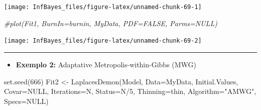 \documentclass[
]{book}
\newenvironment{Shaded}{\begin{snugshade}}{\end{snugshade}}
\newcommand{\AttributeTok}[1]{\textcolor[rgb]{0.77,0.63,0.00}{#1}}
\newcommand{\CommentTok}[1]{\textcolor[rgb]{0.56,0.35,0.01}{\textit{#1}}}
\newcommand{\ConstantTok}[1]{\textcolor[rgb]{0.00,0.00,0.00}{#1}}
\newcommand{\DecValTok}[1]{\textcolor[rgb]{0.00,0.00,0.81}{#1}}
\newcommand{\FunctionTok}[1]{\textcolor[rgb]{0.00,0.00,0.00}{#1}}
\newcommand{\NormalTok}[1]{#1}
\newcommand{\OtherTok}[1]{\textcolor[rgb]{0.56,0.35,0.01}{#1}}
\newcommand{\SpecialCharTok}[1]{\textcolor[rgb]{0.00,0.00,0.00}{#1}}
\newcommand{\StringTok}[1]{\textcolor[rgb]{0.31,0.60,0.02}{#1}}
\providecommand{\tightlist}{%
  \setlength{\itemsep}{0pt}\setlength{\parskip}{0pt}}
\begin{document}
\begin{Shaded}
\end{Shaded}

\begin{center}\texttt{[image: InfBayes\_files/figure-latex/unnamed-chunk-69-1]} \end{center}

\begin{Shaded}
\begin{Highlighting}[]
\CommentTok{\#plot(Fit1, BurnIn=burnin, MyData, PDF=FALSE, Parms=NULL)}
\end{Highlighting}
\end{Shaded}

\begin{center}\texttt{[image: InfBayes\_files/figure-latex/unnamed-chunk-69-2]} \end{center}

\begin{center}\rule{0.5\linewidth}{0.5pt}\end{center}

\begin{itemize}
\tightlist
\item
  \textbf{Exemplo 2:} Adaptative Metropolis-within-Gibbs (MWG)
\end{itemize}

\begin{Shaded}
\begin{Highlighting}[]
\FunctionTok{set.seed}\NormalTok{(}\DecValTok{666}\NormalTok{)}
\NormalTok{Fit2 }\OtherTok{\textless{}{-}} \FunctionTok{LaplacesDemon}\NormalTok{(Model, }\AttributeTok{Data=}\NormalTok{MyData, Initial.Values,}
  \AttributeTok{Covar=}\ConstantTok{NULL}\NormalTok{, }\AttributeTok{Iterations=}\NormalTok{N, }\AttributeTok{Status=}\NormalTok{N}\SpecialCharTok{/}\DecValTok{5}\NormalTok{, }\AttributeTok{Thinning=}\NormalTok{thin,}
  \AttributeTok{Algorithm=}\StringTok{"AMWG"}\NormalTok{, }\AttributeTok{Specs=}\ConstantTok{NULL}\NormalTok{)}
\end{Highlighting}
\end{Shaded}
\end{document}
